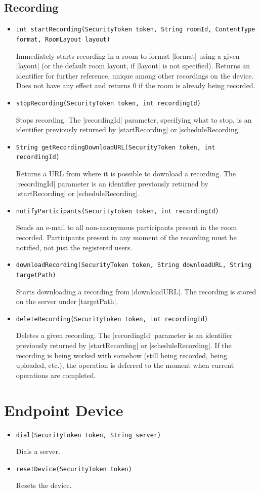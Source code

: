 \documentclass[a4paper]{report}
\newenvironment{Api}{\begin{itemize}}{\end{itemize}}
\newcommand{\ApiCode}[1]{\lstinline[style=styleApi]|#1|}
\newcommand{\ApiItem}[1]{\item #1 %

}
\newcommand{\ApiCmd}[1]{\ApiItem{\ApiCode{#1}}}
\begin{document}
\subsection{Recording}
\begin{Api}

\ApiCmd{int startRecording(SecurityToken token, String roomId, ContentType format, RoomLayout layout)}
Immediately starts recording in a room to format |format| using a given |layout| (or the default room layout, if |layout| is not specified). Returns an identifier for further reference, unique among other recordings on the device. Does not have any effect and returns 0 if the room is already being recorded.

\ApiCmd{stopRecording(SecurityToken token, int recordingId)}
Stops recording. The |recordingId| parameter, specifying what to stop, is an identifier previously returned by |startRecording| or |scheduleRecording|.

\ApiCmd{String getRecordingDownloadURL(SecurityToken token, int recordingId)}
Returns a URL from where it is possible to download a recording. The |recordingId| parameter is an identifier previously returned by |startRecording| or |scheduleRecording|.

\ApiCmd{notifyParticipants(SecurityToken token, int recordingId)}
Sends an e-mail to all non-anonymous participants present in the room recorded. Participants present in any moment of the recording must be notified, not just the registered users.

\ApiCmd{downloadRecording(SecurityToken token, String downloadURL, String targetPath)}
Starts downloading a recording from |downloadURL|. The recording is stored on the server under |targetPath|.

\ApiCmd{deleteRecording(SecurityToken token, int recordingId)}
Deletes a given recording. The |recordingId| parameter is an identifier previously returned by |startRecording| or |scheduleRecording|. If the recording is being worked with somehow (still being recorded, being uploaded, etc.), the operation is deferred to the moment when current operations are completed.

\end{Api}


\section{Endpoint Device} \label{sect:connector-endpoint-api}

\begin{Api}

\ApiCmd{dial(SecurityToken token, String server)}
Dials a server.

\ApiCmd{resetDevice(SecurityToken token)}
Resets the device.

\end{Api}
\end{document}
